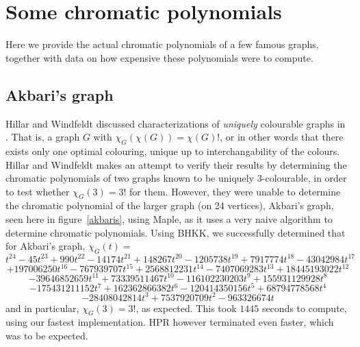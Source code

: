 \documentclass[a4paper]{article}
\begin{document}
\section{Some chromatic polynomials}
Here we provide the actual chromatic polynomials of a few famous graphs, together with data on how expensive these polynomials were to compute.

\subsection{Akbari's graph}
Hillar and Windfeldt discussed characterizations of \emph{uniquely} colourable graphs in \cite{hillar_windfeldt}. That is, a graph $G$ with $\chi_G(\chi(G)) = \chi(G)!$, or in other words that there exists only one optimal colouring, unique up to interchangability of the colours. Hillar and Windfeldt makes an attempt to verify their results by determining the chromatic polynomials of two graphs known to be uniquely 3-colourable, in order to test whether $\chi_G(3) = 3!$ for them. However, they were unable to determine the chromatic polynomial of the larger graph (on 24 vertices), Akbari's graph, seen here in figure~\ref{akbaris}, using Maple, as it uses a very naive algorithm to determine chromatic polynomials. Using BHKK, we successfully determined that for Akbari's graph, $\chi_G(t) = $
\[
t^{24} - 45t^{23} + 990t^{22} -14174t^{21} + 148267t^{20} - 1205738t^{19} + 7917774t^{18} - 43042984t^{17}
\]
\[
+ 197006250t^{16} - 767939707t^{15} + 2568812231t^{14} - 7407069283t^{13} + 18445193022t^{12}
\]
\[
- 39646852659t^{11} + 73339511467t^{10} - 116102230203t^9 + 155931129928t^8
\]
\[
- 175431211152t^7 + 162362866382t^6 - 120414350156t^5 + 68794778568t^4
\]
\[
- 28408042814t^3 + 7537920709t^2 - 963326674t
\]
and in particular, $\chi_G(3) = 3!$, as expected. This took $1445$ seconds to compute, using our fastest implementation. HPR however terminated even faster, which was to be expected.
\end{document}
